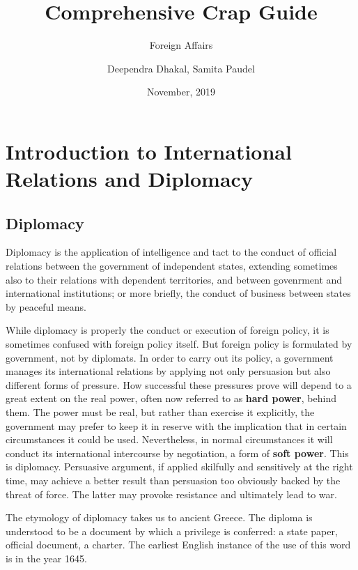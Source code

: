 \documentclass[
  openany]{book}
\title{Comprehensive Crap Guide}
\subtitle{Foreign Affairs}
\author{Deependra Dhakal, Samita Paudel}
\date{November, 2019}
\begin{document}
\maketitle

{
\setcounter{tocdepth}{1}
\tableofcontents
}
\hypertarget{introduction-to-international-relations-and-diplomacy}{%
\chapter{Introduction to International Relations and Diplomacy}\label{introduction-to-international-relations-and-diplomacy}}

\hypertarget{diplomacy}{%
\section{Diplomacy}\label{diplomacy}}

Diplomacy is the application of intelligence and tact to the conduct of official relations between the government of independent states, extending sometimes also to their relations with dependent territories, and between govenrment and international institutions; or more briefly, the conduct of business between states by peaceful means.

While diplomacy is properly the conduct or execution of foreign policy, it is sometimes confused with foreign policy itself. But foreign policy is formulated by government, not by diplomats. In order to carry out its policy, a government manages its international relations by applying not only persuasion but also different forms of pressure. How successful these pressures prove will depend to a great extent on the real power, often now referred to as \textbf{hard power}, behind them. The power must be real, but rather than exercise it explicitly, the government may prefer to keep it in reserve with the implication that in certain circumstances it could be used. Nevertheless, in normal circumstances it will conduct its international intercourse by negotiation, a form of \textbf{soft power}. This is diplomacy. Persuasive argument, if applied skilfully and sensitively at the right time, may achieve a better result than persuasion too obviously backed by the threat of force. The latter may provoke resistance and ultimately lead to war.

The etymology of diplomacy takes us to ancient Greece. The diploma is understood to be a document by which a privilege is conferred: a state paper, official document, a charter. The earliest English instance of the use of this word is in the year 1645.
\end{document}

